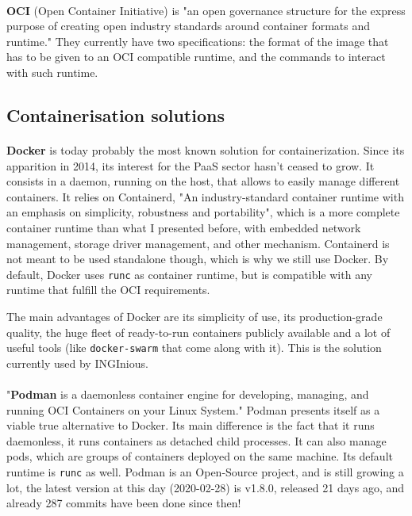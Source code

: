 \paragraph{}\textbf{OCI} (Open Container Initiative) is "an open governance structure for the express purpose of creating open industry standards around container formats and runtime."\cite{oci} They currently have two specifications: the format of the image that has to be given to an OCI compatible runtime, and the commands to interact with such runtime.

\subsection{Containerisation solutions}
\paragraph{}\textbf{Docker}\cite{merkel2014docker} is today probably the most known solution for containerization.  Since its apparition in 2014, its interest for the PaaS sector hasn't ceased to grow.  It consists in a daemon, running on the host, that allows to easily manage different containers.  It relies on Containerd, "An industry-standard container runtime with an emphasis on simplicity, robustness and portability"\cite{containerd}, which is a more complete container runtime than what I presented before, with embedded network management, storage driver management, and other mechanism.  Containerd is not meant to be used standalone though, which is why we still use Docker.  By default, Docker uses \texttt{runc} as container runtime, but is compatible with any runtime that fulfill the OCI\cite{oci} requirements.

The main advantages of Docker are its simplicity of use, its production-grade quality, the huge fleet of ready-to-run containers publicly available and a lot of useful tools (like \texttt{docker-swarm} that come along with it).  This is the solution currently used by INGInious.

\paragraph{}"\textbf{Podman} is a daemonless container engine for developing, managing, and running OCI\cite{oci} Containers on your Linux System."\cite{podman}  Podman presents itself as a viable true alternative to Docker.  Its main difference is the fact that it runs daemonless, it runs containers as detached child processes.  It can also manage pods, which are groups of containers deployed on the same machine. Its default runtime is \texttt{runc} as well.  Podman is an Open-Source project, and is still growing a lot, the latest version at this day (2020-02-28) is v1.8.0, released 21 days ago, and already 287 commits have been done since then!

